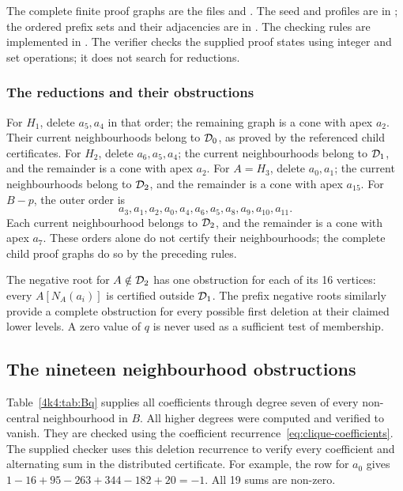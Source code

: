 The complete finite proof graphs are the files
 and
.
The seed and profiles are in ;
the ordered prefix sets and their adjacencies are in
. The checking rules are implemented in
. The verifier checks the supplied proof
states using integer and set operations; it does not search for reductions.

\subsubsection{The reductions and their obstructions}
For \(H_1\), delete \(a_5,a_4\) in that order; the remaining graph
is a cone with apex \(a_2\). Their current neighbourhoods belong
to \(\mathcal D_0\), as proved by the referenced child certificates.
For \(H_2\), delete \(a_6,a_5,a_4\); the current neighbourhoods
belong to \(\mathcal D_1\), and the remainder is a cone with apex \(a_2\).
For \(A=H_3\), delete \(a_0,a_1\); the current neighbourhoods belong
to \(\mathcal D_2\), and the remainder is a cone with apex \(a_{15}\).
For \(B-p\), the outer order is
\[
a_3,a_1,a_2,a_0,a_4,a_6,a_5,a_8,a_9,a_{10},a_{11}.
\]
Each current neighbourhood belongs to \(\mathcal D_2\), and the remainder
is a cone with apex \(a_7\).
These orders alone do not certify their neighbourhoods;
the complete child proof graphs do so by the preceding rules.

The negative root for \(A\notin\mathcal D_2\) has one obstruction for each
of its 16 vertices: every \(A[N_A(a_i)]\) is certified outside
\(\mathcal D_1\). The prefix negative roots similarly provide a complete
obstruction for every possible first deletion at their claimed
lower levels. A zero value of \(q\) is never used as a sufficient test of membership.

\subsection{The nineteen neighbourhood obstructions}
Table~\ref{4k4:tab:Bq} supplies all coefficients through degree seven
of every non-central neighbourhood in \(B\).
All higher degrees were computed and verified to vanish.
They are checked using the coefficient recurrence~\eqref{eq:clique-coefficients}.
The supplied checker uses this deletion recurrence to verify every
coefficient and alternating sum in the distributed certificate.
For example, the row for \(a_0\) gives
\(1-16+95-263+344-182+20=-1\).
All 19 sums are non-zero.



